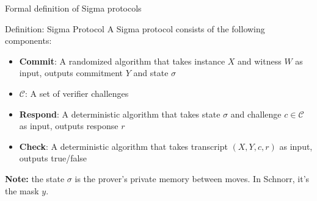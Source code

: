 \ifdefined\PRESENTATION\else\PassOptionsToClass{handout}{beamer}\fi\documentclass[aspectratio=169, lualatex]{beamer}
\begin{document}
\begin{frame}{Formal definition of Sigma protocols}
	\begin{block}{Definition: Sigma Protocol}
		A Sigma protocol consists of the following components:
		\begin{itemize}
			\item \textbf{Commit}: A randomized algorithm that takes instance $X$ and witness $W$ as input, outputs commitment $Y$ and state $\sigma$
			\item $\mathcal{C}$: A set of verifier challenges
			\item \textbf{Respond}: A deterministic algorithm that takes state $\sigma$ and challenge $c \in \mathcal{C}$ as input, outputs response $r$
			\item \textbf{Check}: A deterministic algorithm that takes transcript $(X, Y, c, r)$ as input, outputs true/false
		\end{itemize}
	\end{block}
	\textbf{Note:} the state $\sigma$ is the prover's private memory between moves. In Schnorr, it's the mask $y$.
\end{frame}
\end{document}
